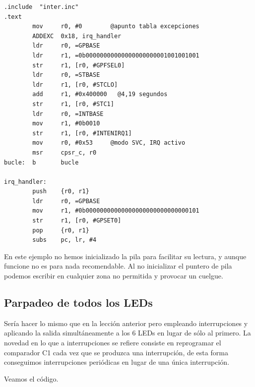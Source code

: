 \begin{lstlisting}[caption={inter1.c},label={lst:codigoPract5_1}]
        .include  "inter.inc"
.text
        mov     r0, #0        @apunto tabla excepciones
        ADDEXC  0x18, irq_handler
        ldr     r0, =GPBASE
        ldr     r1, =0b00000000000000000000001001001001
        str     r1, [r0, #GPFSEL0]
        ldr     r0, =STBASE
        ldr     r1, [r0, #STCLO]
        add     r1, #0x400000   @4,19 segundos
        str     r1, [r0, #STC1]
        ldr     r0, =INTBASE
        mov     r1, #0b0010
        str     r1, [r0, #INTENIRQ1]
        mov     r0, #0x53     @modo SVC, IRQ activo
        msr     cpsr_c, r0
bucle:  b       bucle

irq_handler:
        push    {r0, r1}
        ldr     r0, =GPBASE
        mov     r1, #0b00000000000000000000000000000101
        str     r1, [r0, #GPSET0]
        pop     {r0, r1}
        subs    pc, lr, #4
\end{lstlisting}

En este ejemplo no hemos inicializado la pila para facilitar su lectura,
y aunque funcione no es para nada recomendable. Al no inicializar el puntero
de pila podemos escribir en cualquier zona no permitida y provocar un cuelgue.

\subsection{Parpadeo de todos los LEDs}

Sería hacer lo mismo que en la lección anterior pero empleando interrupciones y aplicando
la salida simultáneamente a los 6 LEDs en lugar de sólo al primero. La novedad en lo
que a interrupciones se refiere consiste en reprogramar el comparador C1 cada vez que
se produzca una interrupción, de esta forma conseguimos interrupciones periódicas en lugar
de una única interrupción.

Veamos el código.

